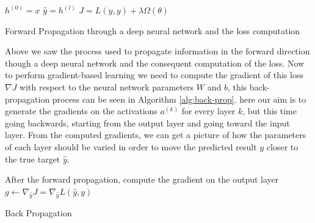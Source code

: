 \documentclass[14pt]{extarticle}
\numberwithin{equation}{section}
\begin{document}
				\begin{algorithm}[H]
			\DontPrintSemicolon
			\SetAlgoLined
			\BlankLine
			$h^{(0)} = x$\;
			$\hat{y} = h^{(l)}$\;
			$J = L(\hat{y},y) + \lambda	\Omega(\theta)$
			
			\caption{Forward Propagation through a deep neural network and the loss computation}\label{alg:forward-prop}
		\end{algorithm}
		
		Above we saw the process used to propagate information in the forward direction though a deep neural network and the consequent computation of the loss. Now to perform gradient-based learning we need to compute the gradient of this loss $\nabla J$ with respect to the neural network parameters $W$ and $b$, this back-propagation process can be seen in Algorithm \ref{alg:back-prop}. here our aim is to generate the gradients on the activations $a^(k)$ for every layer $k$, but this time going backwards, starting from the output layer and going toward the input layer. From the computed gradients, we can get a picture of how the parameters of each layer should be varied in order to move the predicted result $y$ closer to the true target $\hat{y}$.
		\begin{algorithm}[H]
		\DontPrintSemicolon
		\SetAlgoLined
		After the forward propagation, compute the gradient on the output layer\;
		$g \leftarrow \nabla_{\hat{y}}J = \nabla_{\hat{y}}L(\hat{y}, y)$\;
		\caption{Back Propagation}\label{alg:back-prop}
	\end{algorithm}
\end{document}
